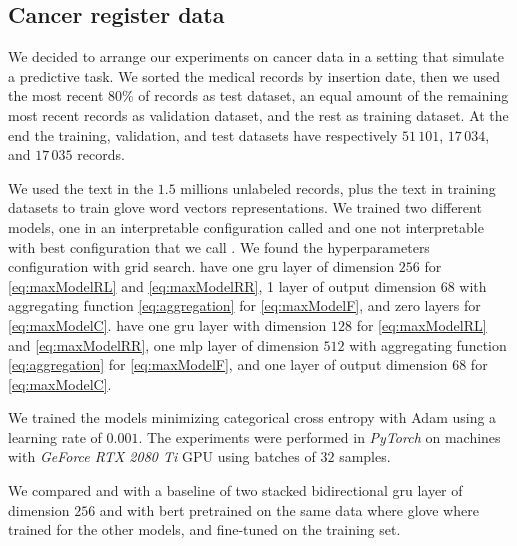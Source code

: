 \subsection{Cancer register data}
We decided to arrange our experiments on cancer
data in 
a setting that simulate a predictive task. We sorted the medical
records by insertion date, then we used the most recent $80\%$ of
records as test 
dataset, an equal amount of the remaining most recent records as
validation dataset, and the rest as training dataset. At the end the
training, validation, and test datasets have respectively $51\,101$,
$17\,034$, and $17\,035$ records.

We used the text in the $1.5$ millions unlabeled records, plus the
text in training datasets to train \ac{glove} word
vectors representations. We trained two different models, one
in an interpretable configuration called \maxi{} and one not
interpretable with 
best configuration that we call \maxp{}. We found the hyperparameters
configuration with grid search. 
\maxi{} have one \ac{gru} layer of dimension $256$
for \eqref{eq:maxModelRL} and \eqref{eq:maxModelRR}, 1 layer of
output dimension $68$ with aggregating function \eqref{eq:aggregation}
for \eqref{eq:maxModelF}, and zero layers for \eqref{eq:maxModelC}. 
\maxp{} have
one \ac{gru} layer with
dimension $128$ for \eqref{eq:maxModelRL} and \eqref{eq:maxModelRR},
one \ac{mlp} layer of dimension $512$ with aggregating function
\eqref{eq:aggregation} for \eqref{eq:maxModelF}, and
one layer of output dimension $68$ for \eqref{eq:maxModelC}.

We trained the models minimizing categorical cross entropy with Adam
\cite{kingma2014adam} using a learning rate of $0.001$. The
experiments were performed in \emph{PyTorch} on machines with
\emph{GeForce RTX 2080 Ti} 
GPU using batches of $32$ samples.

We compared \maxp{} and \maxi{} with a baseline of two stacked
bidirectional 
\ac{gru} layer of dimension $256$ and with \ac{bert} pretrained on the
same data where \ac{glove} where trained for the other models, and
fine-tuned on the training set.

